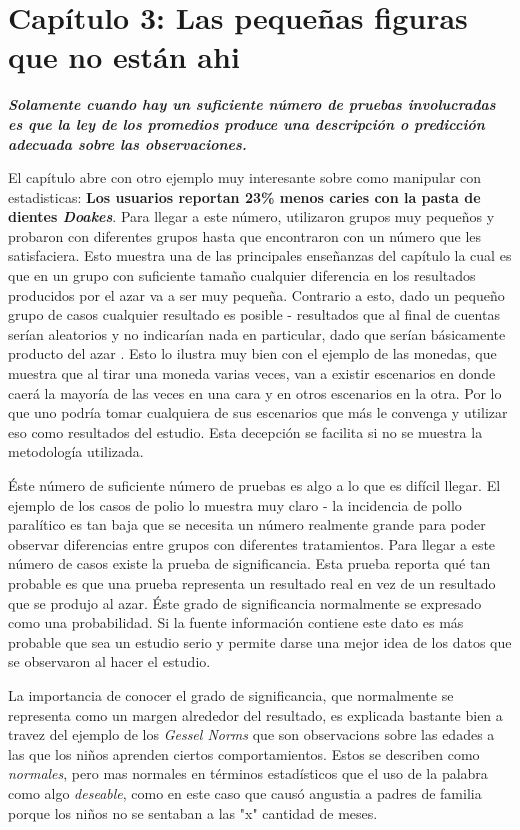 \documentclass[letterpaper, 11pt]{article}
\begin{document}
\section*{Capítulo 3: Las pequeñas figuras que no están ahi}

\textbf{\textit{Solamente cuando hay un suficiente número de pruebas involucradas es que la ley de los promedios produce una descripción o predicción adecuada sobre las observaciones.}}

El capítulo abre con otro ejemplo muy interesante sobre como manipular con estadisticas: \textbf{Los usuarios reportan 23\% menos caries con la pasta de dientes \textit{Doakes}}. Para llegar a este número, utilizaron grupos muy pequeños y probaron con diferentes grupos hasta que encontraron con un número que les satisfaciera. Esto muestra una de las principales enseñanzas del capítulo la cual es que en un grupo con suficiente tamaño cualquier diferencia en los resultados producidos por el azar va a ser muy pequeña. Contrario a esto, dado un pequeño grupo de casos cualquier resultado es posible - resultados que al final de cuentas serían aleatorios y no indicarían nada en particular, dado que serían básicamente producto del azar . Esto lo ilustra muy bien con el ejemplo de las monedas, que muestra que al tirar una moneda varias veces, van a existir escenarios en donde caerá la mayoría de las veces en una cara y en otros escenarios en la otra. Por lo que uno podría tomar cualquiera de sus escenarios que más le convenga y utilizar eso como resultados del estudio. Esta decepción se facilita si no se muestra la metodología utilizada.

Éste número de suficiente número de pruebas es algo a lo que es difícil llegar. El ejemplo de los casos de polio lo muestra muy claro - la incidencia de pollo paralítico es tan baja que se necesita un número realmente grande para poder observar diferencias entre grupos con diferentes tratamientos. Para llegar a este número de casos existe la prueba de significancia. Esta prueba reporta qué tan probable es que una prueba representa un resultado real en vez de un resultado que se produjo al azar. Éste grado de significancia normalmente se expresado como una probabilidad. Si la fuente información contiene este dato es más probable que sea un estudio serio y permite darse una mejor idea de los datos que se observaron al hacer el estudio. 

La importancia de conocer el grado de significancia, que normalmente se representa como un margen alrededor del resultado, es explicada bastante bien a travez del ejemplo de los \textit{Gessel Norms} que son observacions sobre las edades a las que los niños aprenden ciertos comportamientos. Estos se describen como \textit{normales}, pero mas normales en términos estadísticos que el uso de la palabra como algo \textit{deseable}, como en este caso que causó angustia a padres de familia porque los niños no se sentaban a las "x" cantidad de meses.
\end{document}
